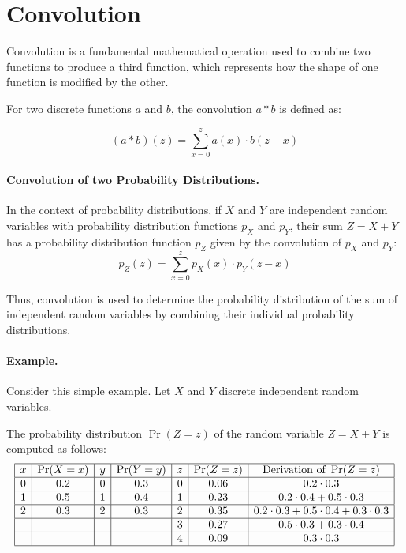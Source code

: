 \documentclass{masterthesis}
\begin{document}
\section{Convolution}\label{app:convolution}

Convolution is a fundamental mathematical operation used to combine two functions to produce a third function, which represents how the shape of one function is modified by the other. 

For two discrete functions \(a\) and \(b\), the convolution \(a * b\) is defined as:

\begin{equation}
    (a * b)(z) = \sum_{x=0}^{z} a(x) \cdot b(z - x)
\end{equation}

\paragraph*{Convolution of two Probability Distributions.}\label{paragraph:convolution_distributions}
In the context of probability distributions, if \(X\) and \(Y\) are independent random variables with probability distribution functions \(p_X\) and \(p_Y\), their sum \(Z = X + Y\) has a probability distribution function \(p_Z\) given by the convolution of \(p_X\) and \(p_Y\):
\begin{equation}\label{eq:convolution}
    p_Z(z) = \sum_{x=0}^{z} p_X(x) \cdot p_Y(z - x)
\end{equation}

Thus, convolution is used to determine the probability distribution of the sum of independent random variables by combining their individual probability distributions.

\paragraph*{Example.} 

Consider this simple example. Let $X$ and $Y$ discrete independent random variables. 

The probability distribution $\Pr(Z = z)$ of the random variable $Z = X + Y$ is computed as follows:
\begin{equation*}\label{eq:convolution_example}
    \begin{array}{|c|c|c|c|c|c|c|}
        \hline
        x & \Pr(X = x) & y & \Pr(Y = y) & z & \Pr(Z = z) & \text{Derivation of }\Pr(Z = z)\\
        \hline
        0 & 0.2 & 0 & 0.3 & 0 & 0.06 & 0.2 \cdot 0.3 \\
        \hline
        1 & 0.5 & 1 & 0.4 & 1 & 0.23 & 0.2 \cdot 0.4 + 0.5 \cdot 0.3 \\
        \hline
        2 & 0.3 & 2 & 0.3 & 2 & 0.35 & 0.2 \cdot 0.3 + 0.5 \cdot 0.4 + 0.3 \cdot 0.3 \\
        \hline
         &  &  &  & 3 & 0.27 & 0.5 \cdot 0.3 + 0.3 \cdot 0.4 \\
        \hline
         &  &  &  & 4 & 0.09 & 0.3 \cdot 0.3 \\
        \hline
    \end{array}
\end{equation*}
\end{document}
